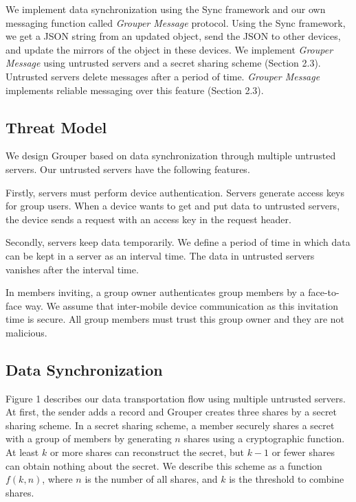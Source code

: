 \documentclass[twocolumn,10pt]{article}
\begin{document}
We implement data synchronization using the Sync framework\cite{sync} and our own messaging function called \emph{Grouper Message} protocol.
Using the Sync framework, we get a JSON string from an updated object, send the JSON to other devices, and update the mirrors of the object in these devices. 
We implement \emph{Grouper Message} using untrusted servers and a secret sharing scheme  (Section 2.3). 
Untrusted servers delete messages after a period of time. 
\emph{Grouper Message} implements reliable messaging over this feature (Section 2.3).

\subsection{Threat Model}

We design Grouper based on data synchronization through multiple untrusted servers. Our untrusted servers have the following features.

Firstly, servers must perform device authentication. 
Servers generate access keys for group users. 
When a device wants to get and put data to untrusted servers, the device sends a request with an access key in the request header.

Secondly, servers keep data temporarily.
We define a period of time in which data can be kept in a server as an interval time. 
The data in untrusted servers vanishes after the interval time.

In members inviting, a group owner authenticates group members by a face-to-face way. We assume that inter-mobile device communication as this invitation time is secure. All group members must trust this group owner and they are not malicious.

\subsection{Data Synchronization}

Figure 1 describes our data transportation flow using multiple untrusted servers. 
At first, the sender adds a record and Grouper creates three shares by a secret sharing scheme. 
In a secret sharing scheme, a member securely shares a secret with a group of members by generating $n$ shares using a cryptographic function. 
At least $k$ or more shares can reconstruct the secret, but $k-1$ or fewer shares can obtain nothing about the secret\cite{pang2005new}. 
We describe this scheme as a function $f(k, n)$, where $n$ is the number of all shares, and $k$ is the threshold to combine shares. 
 
\end{document}
